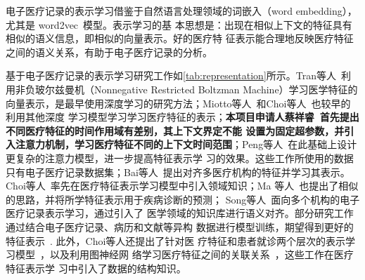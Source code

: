 电子医疗记录的表示学习借鉴于自然语言处理领域的词嵌入（word embedding），尤其是
word2vec~模型。表示学习的基
本思想是：出现在相似上下文的特征具有相似的语义信息，即相似的向量表示。好的医疗特
征表示能合理地反映医疗特征之间的语义关系，有助于电子医疗记录的分析。

基于电子医疗记录的表示学习研究工作如\cref{tab:representation}所示。Tran等人~利用非负玻尔兹曼机（Nonnegative Restricted Boltzman
Machine）学习医学特征的向量表示，是最早使用深度学习的研究方法；Miotto等人~和Choi等人~也较早的利用其他深度
学习模型学习学习医疗特征的表示；\textbf{本项目申请人蔡祥睿~首先提出不同医疗特征的时间作用域有差别，其上下文界定不能
设置为固定超参数，并引入注意力机制，学习医疗特征不同的上下文时间范围}；Peng等人~在此基础上设计更复杂的注意力模型，进一步提高特征表示学
习的效果。这些工作所使用的数据只有电子医疗记录数据集；Bai等人~提出对齐多医疗机构的特征并学习其表示。Choi等人~率先在医疗特征表示学习模型中引入领域知识；Ma
等人~也提出了相似的思路，并将所学特征表示用于疾病诊断的预测；
Song等人~面向多个机构的电子医疗记录表示学习，通过引入了
医学领域的知识库进行语义对齐。部分研究工作通过结合电子医疗记录、病历和文献等异构
数据进行模型训练，期望得到更好的特征表示~. 此外，Choi等人还提出了针对医
疗特征和患者就诊两个层次的表示学习模型~，以及利用图神经网
络学习医疗特征之间的关联关系~，这些工作在医疗特征表示学
习中引入了数据的结构知识。

